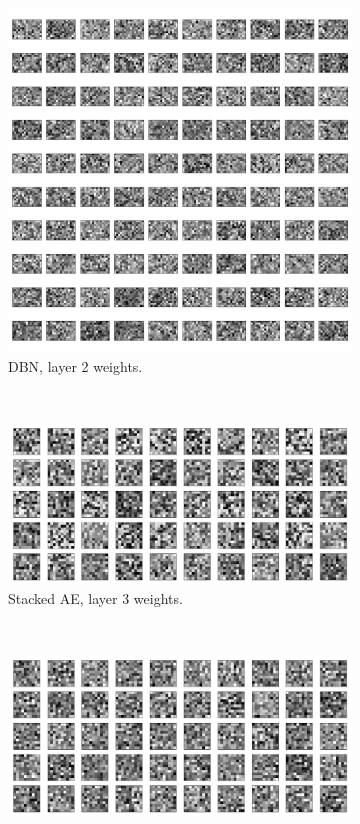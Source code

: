 \documentclass{article}
\begin{document}
\begin{figure}[!ht]
\begin{subfigure}[t]{0.47\textwidth}
    \includegraphics[width=\textwidth]{../plots/3_2_1/dbn_2l.png}
    \caption{DBN, layer 2 weights.}
    \label{fig:w50rbm}
  \end{subfigure}
  \addtocounter{subfigure}{-2}
  ~
  \begin{subfigure}[t]{0.47\textwidth}
    \centering
    \includegraphics[width=\textwidth]{../plots/3_2_1/sae_3l.png}
    \caption{Stacked AE, layer 3 weights.}
    \label{fig:w100ae}
  \end{subfigure}
  \addtocounter{subfigure}{1}
  ~
  \begin{subfigure}[t]{0.47\textwidth}
    \centering
    \includegraphics[width=\textwidth]{../plots/3_2_1/dbn_3l.png}

\end{subfigure}
\end{figure}
\end{document}
